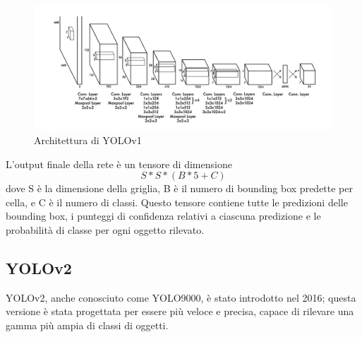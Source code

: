\begin{figure}[ht]
    \centering
    \includegraphics[width=1\textwidth]{files/capitoli/2-yolo/assets/yolov1-architecture.png}
    \caption{\label{fig:yolov1-architecture}Architettura di YOLOv1\cite{17}}
\end{figure}

L'output finale della rete è un tensore di dimensione
\[ S*S*(B*5 + C) \]
dove S è la dimensione della griglia, B è il numero di bounding box predette per cella, e C è il numero di classi. Questo tensore contiene tutte le predizioni delle bounding box, i punteggi di confidenza relativi a ciascuna predizione e le probabilità di classe per ogni oggetto rilevato.

\newpage

\subsection{YOLOv2}
YOLOv2, anche conosciuto come YOLO9000, è stato introdotto nel 2016\cite{18}; questa versione è stata progettata per essere più veloce e precisa, capace di rilevare una gamma più ampia di classi di oggetti.

